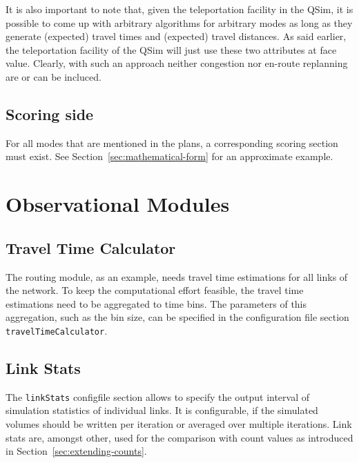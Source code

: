 It is also important to note that, given the teleportation facility in the QSim, it is possible to come up with arbitrary algorithms for arbitrary modes as long as they generate (expected) travel times and (expected) travel distances.  As said earlier, the teleportation facility of the QSim will just use these two attributes at face value.  Clearly, with such an approach neither congestion nor en-route replanning are or can be incluced.

\subsection{Scoring side}

For all modes that are mentioned in the plans, a corresponding scoring section must exist.  See Section~\ref{sec:mathematical-form} for an approximate example.


\section{Observational Modules}
\label{sec:observational}

\subsection{Travel Time Calculator}
\label{sec:ttc}
The routing module, as an example, needs travel time estimations for all links of the network. To keep the computational effort feasible, the travel time estimations need to be aggregated to time bins. The parameters of this aggregation, such as the bin size, can be specified in the configuration file section \lstinline|travelTimeCalculator|.

\subsection{Link Stats}
\label{sec:linkStats}
The \lstinline|linkStats| \gls{configfile} section allows to specify the output interval of simulation statistics of individual links. It is configurable, if the simulated volumes should be written per iteration or averaged over multiple iterations. Link stats are, amongst other, used for the comparison with count values as introduced in Section~\ref{sec:extending-counts}. 

